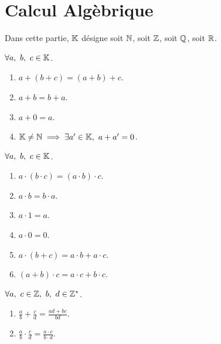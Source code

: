 \chapter{Calcul Algèbrique}
\def\arraystretch{1}

\par \noindent Dans cette partie, $\mathbb{K}$ désigne soit $\mathbb{N}$, soit $\mathbb{Z}$, soit $\mathbb{Q}$, soit $\mathbb{R}$.

\begin{axiom}
    $\forall a,\ b,\ c \in \mathbb{K}$.
    \begin{enumerate}
    	\item $a + (b + c) = (a + b) + c$.
    	\item $a + b = b + a$.
    	\item $a + 0 = a$.
    	\item $\mathbb{K} \neq \mathbb{N} \implies \exists a' \in \mathbb{K},\ a + a' = 0$.
    \end{enumerate}
\end{axiom}

\begin{axiom}
    $\forall a,\ b,\ c \in \mathbb{K}$. 
    \begin{enumerate}
    	\item $a \cdot (b \cdot c) = (a \cdot b) \cdot c$.
    	\item $a \cdot b = b \cdot a$.
    	\item $a \cdot 1 = a$.
    	\item $a \cdot 0 = 0$.
    	\item $a \cdot (b + c) = a \cdot b + a \cdot c$.
    	\item $(a + b) \cdot c = a \cdot c + b \cdot c$.
    \end{enumerate}
\end{axiom}

\begin{proposition}
    $\forall a,\ c \in \mathbb{Z},\ b,\ d \in \mathbb{Z}^*$.
    \begin{multicols}{2}
    	\begin{enumerate}
    		\item $\frac{a}{b} + \frac{c}{d} = \frac{ad + bc}{bd}$.
    		\item $\frac{a}{b} \cdot \frac{c}{d} = \frac{a \cdot c}{b \cdot d}$.
    	\end{enumerate}
    \end{multicols}
\end{proposition}

